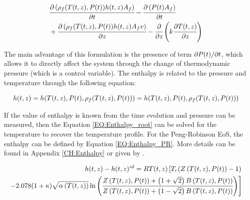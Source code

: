 \documentclass[../Article_Sensitivity_Analsysis.tex]{subfiles}
\begin{document}
			{\footnotesize
				\begin{align} \label{EQ:Enthalpy_equation}
					&\cfrac{\partial \left({\color{black}\rho_f}({\color{black}T}(t,z),{\color{black}P}(t)) {\color{black}h}(t,z) A_f\right)}{\partial t} - \cfrac{\partial \left({\color{black}P}(t) A_f\right)}{\partial t} \nonumber \\
					&+ \cfrac{\partial \left( {\color{black}\rho_f}({\color{black}T}(t,z),{\color{black}P}(t)) {\color{black}h}(t,z) A_f v \right)}{\partial {\color{black}z}} - \cfrac{\partial}{\partial {\color{black}z}} \left( k \cfrac{\partial {\color{black}T}(t,z)}{\partial {\color{black}z}} \right)
				\end{align}
			}
		
			The main advantage of this formulation is the presence of term $\partial {\color{black}P}(t) / \partial t $, which allows it to directly affect the system through the change of thermodynamic pressure (which is a control variable). The enthalpy is related to the pressure and temperature through the following equation:
			
			{\footnotesize
				\begin{equation}
					{\color{black}h}(t,z)={\color{black}h}({\color{black}T}(t,z),{\color{black}P}(t),{\color{black}\rho_f}({\color{black}T}(t,z),{\color{black}P}(t)))={\color{black}h}( {\color{black}T}(t,z),{\color{black}P}(t), {\color{black}\rho_f}({\color{black}T}(t,z),{\color{black}P}(t)) ) 
					\label{EQ:Enthalpy_root}
				\end{equation}
			}
		
			If the value of enthalpy is known from the time evolution and pressure can be measured, then the Equation \ref{EQ:Enthalpy_root} can be solved for the temperature to recover the temperature profile. For the Peng-Robinson EoS, the enthalpy can be defined by Equation \ref{EQ:Enthalpy_PR}. More details can be found in Appendix \ref{CH:Enthalpy} or given by \citet{Gmehling2019}.
			
			{\scriptsize
				\begin{equation}
					\begin{split}
					{\color{black}h}(t,z)-{\color{black}h}(t,z)^{id}={\color{black}R}{\color{black}T}(t,z) \left[{\color{black}T_r}({\color{black}Z}\left({\color{black}T}(t,z), {\color{black}P}(t)\right)-1) \right. \\
					\left. -2.078(1+{\color{black}\kappa} ){\sqrt { {\color{black}\alpha}\left({\color{black}T}(t,z)\right) } } \ln \left(\cfrac{{\color{black}Z}\left({\color{black}T}(t,z), {\color{black}P}(t)\right)+\left( 1+\sqrt{2} \right){\color{black}B}\left({\color{black}T}(t,z), {\color{black}P}(t)\right)}{{\color{black}Z}\left({\color{black}T}(t,z), {\color{black}P}(t)\right)+\left( 1-\sqrt{2} \right){\color{black}B}\left({\color{black}T}(t,z), {\color{black}P}(t)\right)}\right)\right]
					\label{EQ:Enthalpy_PR}
				\end{split}
			\end{equation}				
			}
		
\end{document}
